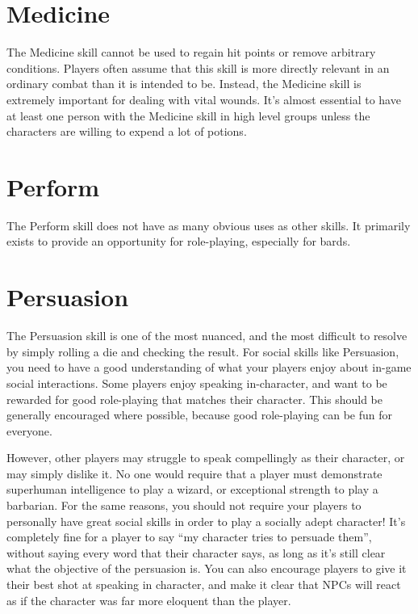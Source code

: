 \section{Medicine}
  The Medicine skill cannot be used to regain hit points or remove arbitrary conditions.
  Players often assume that this skill is more directly relevant in an ordinary combat than it is intended to be.
  Instead, the Medicine skill is extremely important for dealing with vital wounds.
  It's almost essential to have at least one person with the Medicine skill in high level groups unless the characters are willing to expend a lot of potions.

\section{Perform}
  The Perform skill does not have as many obvious uses as other skills.
  It primarily exists to provide an opportunity for role-playing, especially for bards.

\section{Persuasion}
  The Persuasion skill is one of the most nuanced, and the most difficult to resolve by simply rolling a die and checking the result.
  For social skills like Persuasion, you need to have a good understanding of what your players enjoy about in-game social interactions.
  Some players enjoy speaking in-character, and want to be rewarded for good role-playing that matches their character.
  This should be generally encouraged where possible, because good role-playing can be fun for everyone.

  However, other players may struggle to speak compellingly as their character, or may simply dislike it.
  No one would require that a player must demonstrate superhuman intelligence to play a wizard, or exceptional strength to play a barbarian.
  For the same reasons, you should not require your players to personally have great social skills in order to play a socially adept character!
  It's completely fine for a player to say ``my character tries to persuade them'', without saying every word that their character says, as long as it's still clear what the objective of the persuasion is.
  You can also encourage players to give it their best shot at speaking in character, and make it clear that NPCs will react as if the character was far more eloquent than the player.

